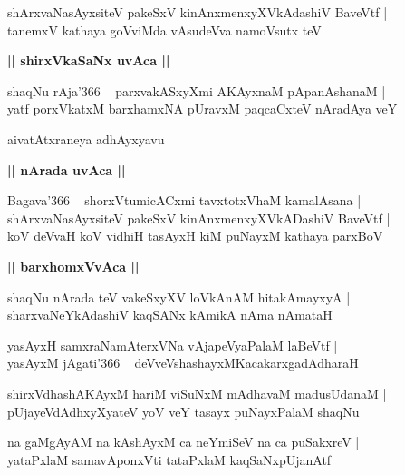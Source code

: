 \documentclass[twoside,12pt,openright]{book}
\newcounter{shloka}[chapter]
\def\uvaca#1{\centerline{{\large\textbf{#1}}}}
\begin{document}
\begin{shloka}%
shArxvaNasAyxsiteV pakeSxV kinAnxmenxyXVkAdashiV BaveVtf |\\
tanemxV kathaya goVviMda vAsudeVva namoVsutx teV 
\end{shloka}

\uvaca{|| shirxVkaSaNx uvAca ||}

\begin{shloka}%
shaqNu rAja\char'366 ~ parxvakASxyXmi AKAyxnaM pApanAshanaM |\\
yatf porxVkatxM barxhamxNA pUravxM paqcaCxteV nAradAya veY
\end{shloka}

\begin{center}
aivatAtxraneya adhAyxyavu
\end{center}

\uvaca{|| nArada uvAca ||}

\begin{shloka}%
Bagava\char'366 ~ shorxVtumicACxmi tavxtotxVhaM kamalAsana |\\
shArxvaNasAyxsiteV pakeSxV kinAnxmenxyXVkADashiV BaveVtf |\\
koV deVvaH koV vidhiH tasAyxH kiM puNayxM kathaya parxBoV
\end{shloka}

\uvaca{|| barxhomxVvAca ||}

\begin{shloka}%
shaqNu nArada teV vakeSxyXV loVkAnAM hitakAmayxyA |\\
sharxvaNeYkAdashiV kaqSANx kAmikA nAma nAmataH 
\end{shloka}

\begin{shloka}%
yasAyxH samxraNamAterxVNa vAjapeVyaPalaM laBeVtf |\\
yasAyxM jAgati\char'366 ~ deVveVshashayxMKacakarxgadAdharaH 
\end{shloka}

\begin{shloka}%
shirxVdhashAKAyxM hariM viSuNxM mAdhavaM madusUdanaM |\\
pUjayeVdAdhxyXyateV yoV veY tasayx puNayxPalaM shaqNu
\end{shloka}

\begin{shloka}%
na gaMgAyAM na kAshAyxM ca neYmiSeV na ca puSakxreV |\\
yataPxlaM samavAponxVti tataPxlaM kaqSaNxpUjanAtf 
\end{shloka}
\end{document}
